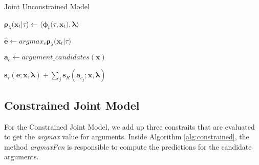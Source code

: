 \documentclass{article} %
\begin{document}

\newlength\algowd
\def\savewd#1{\setbox0=\hbox{#1\hspace{.7in}}\algowd=\wd0\relax#1}
\newcommand\algolines[2]{\savewd{#1}%
  \tcp*{\parbox[t]{\dimexpr\algowidth-\algowd}{#2}}}

\begin{center}
 \begin{algorithm}[!htbp]
    \SetAlgoLined\DontPrintSemicolon
    \caption{Joint Unconstrained Model}
    \label{alg:unconstrained}

    
    $\boldsymbol{\rho}_\lambda(\textbf{x}_t|$\textbf{$\tau$})$ \leftarrow \langle\boldsymbol{\phi}_t($\textbf{$\tau$}$, \textbf{x}_t), \boldsymbol{\lambda}\rangle$\;
    
    $\widehat{\textbf{e}} \leftarrow argmax_e\boldsymbol{\rho}_\lambda(\textbf{x}_t|$\textbf{$\tau$}$)$\;
    
    $\textbf{a}_c \leftarrow argument\_candidates(\textbf{x})$\;
    
    \KwRet $\textbf{s}_\tau(\textbf{e}; \textbf{x}, \boldsymbol{\lambda}) + \sum_{j}\textbf{s}_R(\textbf{a}_{c_j}; \textbf{x}, \boldsymbol{\lambda})$\;
  \end{algorithm}
\end{center}

\subsection*{Constrained Joint Model}

For the Constrained Joint Model, we add up three constraits that are evaluated to get the \textit{argmax} value for arguments. Inside Algorithm \ref{alg:constrained}, the method \textit{argmaxFcn} is responsible to compute the predictions for the candidate arguments.
\end{document}

